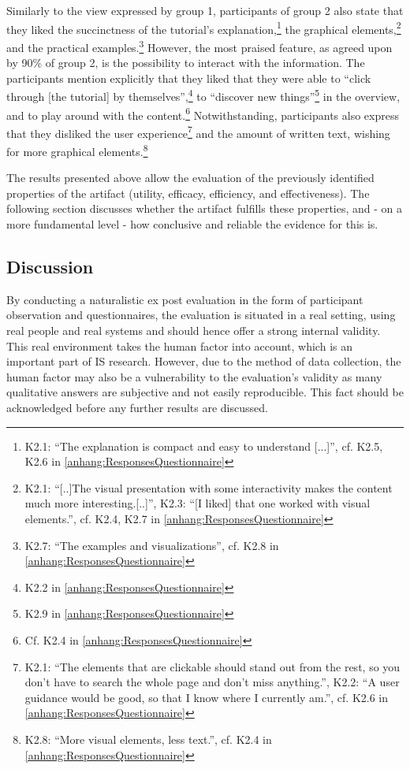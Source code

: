 Similarly to the view expressed by group 1, participants of group 2 also state that they liked the succinctness of the tutorial's explanation,\footnote{K2.1: \enquote{The explanation is compact and easy to understand [...]}, cf. K2.5, K2.6 in \ref{anhang:ResponsesQuestionnaire}} the graphical elements,\footnote{K2.1: \enquote{[..]The visual presentation with some interactivity makes the content much more interesting.[..]}, K2.3: \enquote{[I liked] that one worked with visual elements.}, cf. K2.4, K2.7 in \ref{anhang:ResponsesQuestionnaire}} and the practical examples.\footnote{K2.7: \enquote{The examples and visualizations}, cf. K2.8 in \ref{anhang:ResponsesQuestionnaire}} However, the most praised feature, as agreed upon by 90\% of group 2, is the possibility to interact with the information. The participants mention explicitly that they liked that they were able to \enquote{click through [the tutorial] by themselves},\footnote{K2.2 in \ref{anhang:ResponsesQuestionnaire}} to \enquote{discover new things}\footnote{K2.9 in \ref{anhang:ResponsesQuestionnaire}} in the overview, and to play around with the content.\footnote{Cf. K2.4 in \ref{anhang:ResponsesQuestionnaire}} Notwithstanding, participants also express that they disliked the user experience\footnote{K2.1: \enquote{The elements that are clickable should stand out from the rest, so you don't have to search the whole page and don't miss anything.}, K2.2: \enquote{A user guidance would be good, so that I know where I currently am.}, cf. K2.6 in \ref{anhang:ResponsesQuestionnaire}} and the amount of written text, wishing for more graphical elements.\footnote{K2.8: \enquote{More visual elements, less text.}, cf. K2.4 in \ref{anhang:ResponsesQuestionnaire}}

The results presented above allow the evaluation of the previously identified properties of the artifact (utility, efficacy, efficiency, and effectiveness). The following section discusses whether the artifact fulfills these properties, and - on a more fundamental level - how conclusive and reliable the evidence for this is. 

\subsection{Discussion}
By conducting a naturalistic ex post  evaluation in the form of participant observation and questionnaires, the evaluation is situated in a real setting, using real people and real systems and should hence offer a strong internal validity. This real environment takes the human factor into account, which is an important part of \ac{IS} research. However, due to the method of data collection, the human factor may also be a vulnerability to the evaluation's validity as many qualitative answers are subjective and not easily reproducible. This fact should be acknowledged before any further results are discussed.

